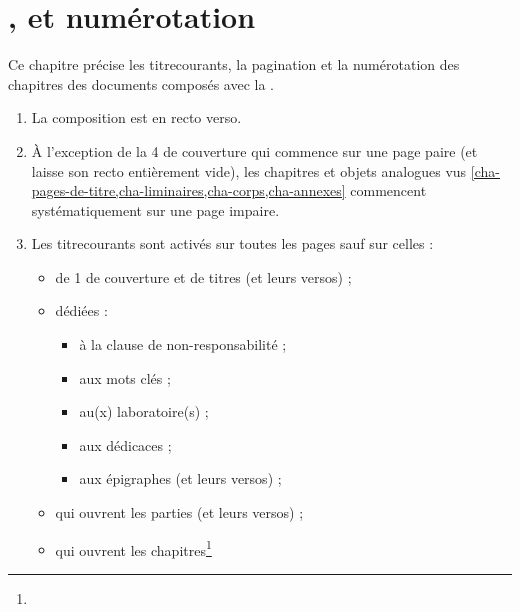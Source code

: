 \chapter{\texorpdfstring{}{Titres courants},  et numérotation}\label{cha-pagination}
%
%
%
%
%
%
%

Ce chapitre précise les \glspl{titrecourant}, la \gls{pagination} et la
numérotation des chapitres des documents composés avec la \yatCl{}.

\begin{enumerate}
\item La composition est en recto verso\exceptoneside.
\item À l'exception de la 4\ieme{} de
  couverture qui commence sur
  une page paire (et laisse
  son recto entièrement vide), les chapitres et objets analogues vus
  \vref{cha-pages-de-titre,cha-liminaires,cha-corps,cha-annexes} commencent
  systématiquement sur une page impaire\exceptoneside.
\item Les \glspl{titrecourant} sont activés sur toutes les pages sauf sur
  celles :
  \begin{itemize}
  \item de 1\iere{} de couverture
    et de titres (et leurs versos) ;
  \item dédiées :
    \begin{itemize}
    \item à la clause de non-responsabilité ;
    \item aux mots clés ;
    \item au(x) laboratoire(s) ;
    \item aux dédicaces ;
    \item aux épigraphes (et leurs versos) ;
    \end{itemize}
  \item qui ouvrent les parties (et leurs versos) ;
  \item qui ouvrent les chapitres\footnote{%
}
\end{itemize}
\end{enumerate}
